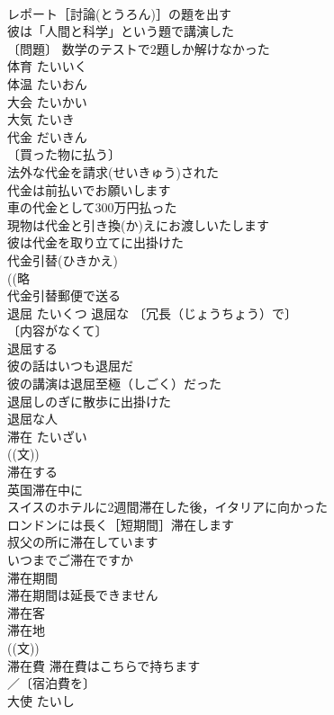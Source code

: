 \documentclass[8pt]{extreport}
\begin{document}
\begin{CJK}{UTF8}{min}
\\	レポート［討論(とうろん)］の題を出す 
\\	彼は「人間と科学」という題で講演した 
\\	〔問題〕 数学のテストで2題しか解けなかった 
\\	体育	たいいく	
\\	体温	たいおん	
\\	大会	たいかい	
\\	大気	たいき	
\\	代金	だいきん	
\\	〔買った物に払う〕
\\	法外な代金を請求(せいきゅう)された 
\\	代金は前払いでお願いします 
\\	車の代金として300万円払った 
\\	現物は代金と引き換(か)えにお渡しいたします 
\\	彼は代金を取り立てに出掛けた 
\\	代金引替(ひきかえ) 
\\	((略
\\	代金引替郵便で送る 
\\	退屈	たいくつ	退屈な 〔冗長（じょうちょう）で〕
\\	〔内容がなくて〕
\\	退屈する 
\\	彼の話はいつも退屈だ 
\\	彼の講演は退屈至極（しごく）だった 
\\	退屈しのぎに散歩に出掛けた 
\\	退屈な人 
\\	滞在	たいざい	
\\	((文)) 
\\	滞在する 
\\	英国滞在中に 
\\	スイスのホテルに2週間滞在した後，イタリアに向かった 
\\	ロンドンには長く［短期間］滞在します 
\\	叔父の所に滞在しています 
\\	いつまでご滞在ですか 
\\	滞在期間 
\\	滞在期間は延長できません 
\\	滞在客 
\\	滞在地 
\\	((文)) 
\\	滞在費 滞在費はこちらで持ちます 
\\	／〔宿泊費を〕
\\	大使	たいし	

\end{CJK}
\end{document}
